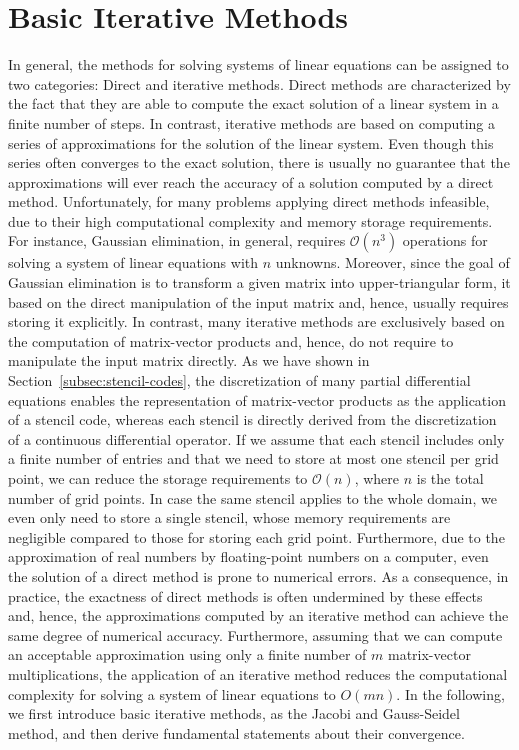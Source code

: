 \section{Basic Iterative Methods}
In general, the methods for solving systems of linear equations can be assigned to two categories: Direct and iterative methods.
Direct methods are characterized by the fact that they are able to compute the exact solution of a linear system in a finite number of steps.
In contrast, iterative methods are based on computing a series of approximations for the solution of the linear system.
Even though this series often converges to the exact solution, there is usually no guarantee that the approximations will ever reach the accuracy of a solution computed by a direct method.
Unfortunately, for many problems applying direct methods infeasible, due to their high computational complexity and memory storage requirements.
For instance, Gaussian elimination, in general, requires $\mathcal O(n^3)$ operations for solving a system of linear equations with $n$ unknowns.
Moreover, since the goal of Gaussian elimination is to transform a given matrix into upper-triangular form, it based on the direct manipulation of the input matrix and, hence, usually requires storing it explicitly.
In contrast, many iterative methods are exclusively based on the computation of matrix-vector products and, hence, do not require to manipulate the input matrix directly.
As we have shown in Section~\ref{subsec:stencil-codes}, the discretization of many partial differential equations enables the representation of matrix-vector products as the application of a stencil code, whereas each stencil is directly derived from the discretization of a continuous differential operator.
If we assume that each stencil includes only a finite number of entries and that we need to store at most one stencil per grid point, we can reduce the storage requirements to $\mathcal{O}(n)$, where $n$ is the total number of grid points.
In case the same stencil applies to the whole domain, we even only need to store a single stencil, whose memory requirements are negligible compared to those for storing each grid point.
Furthermore, due to the approximation of real numbers by floating-point numbers on a computer, even the solution of a direct method is prone to numerical errors.
As a consequence, in practice, the exactness of direct methods is often undermined by these effects and, hence, the approximations computed by an iterative method can achieve the same degree of numerical accuracy.%
Furthermore, assuming that we can compute an acceptable approximation using only a finite number of $m$ matrix-vector multiplications, the application of an iterative method reduces the computational complexity for solving a system of linear equations to $O(mn)$.
In the following, we first introduce basic iterative methods, as the Jacobi and Gauss-Seidel method, and then derive fundamental statements about their convergence. 
